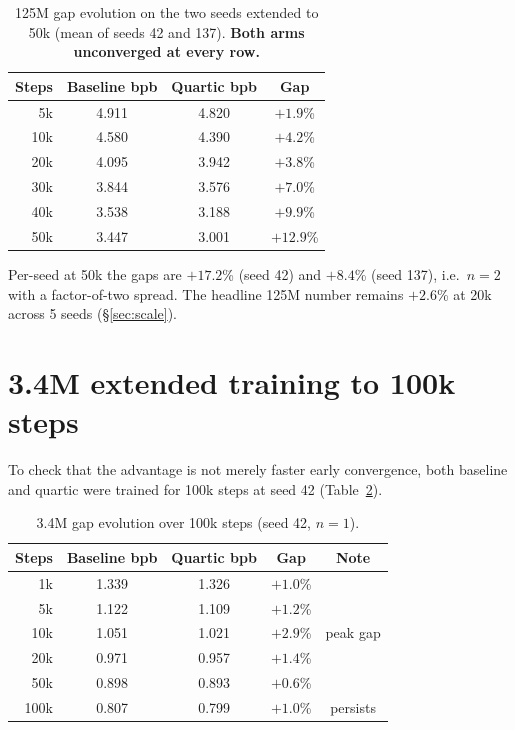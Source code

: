 \documentclass[11pt,a4paper]{article}
\begin{document}
\begin{table}[H]
\centering
\caption{125M gap evolution on the two seeds extended to 50k (mean of seeds 42 and 137). \textbf{Both arms unconverged at every row.}}
\label{tab:125m}
\begin{tabular}{rccc}
\toprule
Steps & Baseline bpb & Quartic bpb & Gap \\
\midrule
5k & 4.911 & 4.820 & $+1.9$\% \\
10k & 4.580 & 4.390 & $+4.2$\% \\
20k & 4.095 & 3.942 & $+3.8$\% \\
30k & 3.844 & 3.576 & $+7.0$\% \\
40k & 3.538 & 3.188 & $+9.9$\% \\
50k & 3.447 & 3.001 & $+12.9$\% \\
\bottomrule
\end{tabular}
\end{table}

Per-seed at 50k the gaps are $+17.2$\% (seed 42) and $+8.4$\% (seed 137), i.e.\ $n=2$ with a factor-of-two spread. The headline 125M number remains $+2.6$\% at 20k across 5 seeds (\S\ref{sec:scale}).

\section{3.4M extended training to 100k steps}
\label{app:100k}

To check that the advantage is not merely faster early convergence, both baseline and quartic were trained for 100k steps at seed 42 (Table~\ref{tab:100k}).

\begin{table}[H]
\centering
\caption{3.4M gap evolution over 100k steps (seed 42, $n=1$).}
\label{tab:100k}
\begin{tabular}{rcccc}
\toprule
Steps & Baseline bpb & Quartic bpb & Gap & Note \\
\midrule
1k & 1.339 & 1.326 & $+1.0$\% & \\
5k & 1.122 & 1.109 & $+1.2$\% & \\
10k & 1.051 & 1.021 & $+2.9$\% & peak gap \\
20k & 0.971 & 0.957 & $+1.4$\% & \\
50k & 0.898 & 0.893 & $+0.6$\% & \\
100k & 0.807 & 0.799 & $+1.0$\% & persists \\
\bottomrule
\end{tabular}
\end{table}
\end{document}

